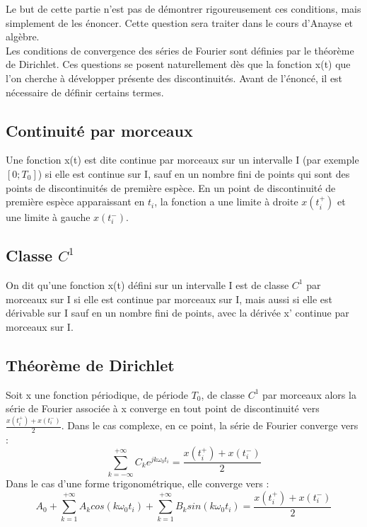 	Le but de cette partie n'est pas de démontrer rigoureusement ces conditions, mais simplement de les énoncer. Cette question sera traiter dans le cours d'Anayse et algèbre.\\
	
	
	Les conditions de convergence des séries de Fourier sont définies par le théorème de Dirichlet. Ces questions se posent naturellement dès que la fonction x(t) que l'on cherche à développer présente des discontinuités. Avant de l'énoncé, il est nécessaire de définir certains termes. 
	
	\subsection{Continuité par morceaux}
	
	Une fonction x(t) est dite continue par morceaux sur un intervalle I (par exemple $[0;T_{0}]$) si elle est continue sur I, sauf en un nombre fini de points qui sont des points de discontinuités de première espèce. En un point de discontinuité de première espèce apparaissant en $t_{i}$, la fonction a une limite à droite $x(t_{i}^{+})$ et une limite à gauche $x(t_{i}^{-})$.
	
	\subsection{Classe $C^{1}$}
	On dit qu'une fonction x(t) défini sur un intervalle I est de classe $C^{1}$ par morceaux sur I si elle est continue par morceaux sur I, mais aussi si elle est dérivable sur I sauf en un nombre fini de points, avec la dérivée x' continue par morceaux sur I.
	
	\subsection{Théorème de Dirichlet}
	Soit x une fonction périodique, de période $T_{0}$, de classe $C^{1}$ par morceaux
	alors la série de Fourier associée à x converge en tout point de discontinuité vers $\frac{x(t_{i}^{+})+x(t_{i}^{-})}{2}$. Dans le cas complexe, en ce point, la série de Fourier converge vers :
	\begin{equation}\label{key}
	\sum_{k=-\infty}^{+\infty}C_{k}e^{jk\omega_{0}t_{i}}=\frac{x(t_{i}^{+})+x(t_{i}^{-})}{2}
	\end{equation}
	Dans le cas d'une forme trigonométrique, elle converge vers :
	\begin{equation}\label{key}
	A_{0}+\sum_{k=1}^{+\infty}A_{k}cos(k\omega_{0}t_{i})+\sum_{k=1}^{+\infty}B_{k}sin(k\omega_{0}t_{i})=\frac{x(t_{i}^{+})+x(t_{i}^{-})}{2}
	\end{equation}
	

